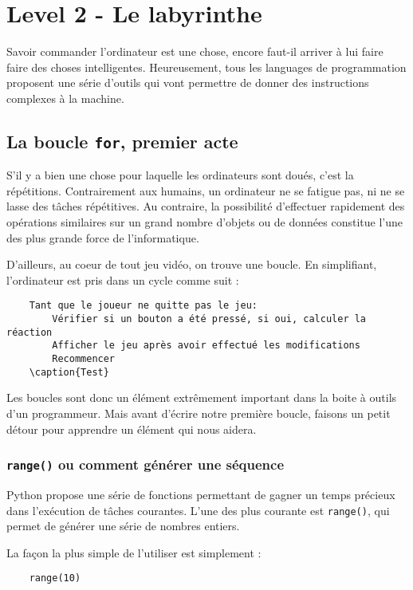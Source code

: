 \chapter{Level 2 - Le labyrinthe}

Savoir commander l'ordinateur est une chose, encore faut-il arriver à lui faire faire des choses intelligentes. Heureusement, tous les languages de programmation proposent une série d'outils qui vont permettre de donner des instructions complexes à la machine.

\section{La boucle \texttt{for}, premier acte}

S'il y a bien une chose pour laquelle les ordinateurs sont doués, c'est la répétitions. Contrairement aux humains, un ordinateur ne se fatigue pas, ni ne se lasse des tâches répétitives. Au contraire, la possibilité d'effectuer rapidement des opérations similaires sur un grand nombre d'objets ou de données constitue l'une des plus grande force de l'informatique.

D'ailleurs, au coeur de tout jeu vidéo, on trouve une boucle. En simplifiant, l'ordinateur est pris dans un cycle comme suit :

\begin{lstlisting}
    Tant que le joueur ne quitte pas le jeu:
        Vérifier si un bouton a été pressé, si oui, calculer la réaction
        Afficher le jeu après avoir effectué les modifications
        Recommencer
    \caption{Test}
\end{lstlisting}

Les boucles sont donc un élément extrêmement important dans la boite à outils d'un programmeur. Mais avant d'écrire notre première boucle, faisons un petit détour pour apprendre un élément qui nous aidera.

\subsection{\texttt{range()} ou comment générer une séquence}

Python propose une série de fonctions permettant de gagner un temps précieux dans l'exécution de tâches courantes. L'une des plus courante est \texttt{range()}, qui permet de générer une série de nombres entiers.

La façon la plus simple de l'utiliser est simplement :

\begin{lstlisting}
    range(10)
\end{lstlisting}

